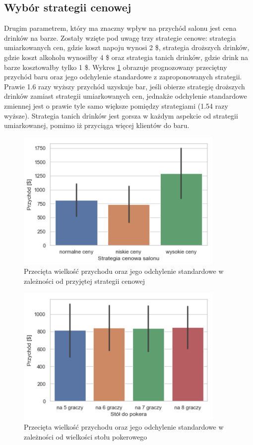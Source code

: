 \documentclass[12pt, a4paper, oneside]{mwart} %
\begin{document}
\subsection{Wybór strategii cenowej}
Drugim parametrem, który ma znaczny wpływ na przychód salonu jest cena drinków na barze. Zostały wzięte pod uwagę trzy strategie cenowe: strategia umiarkowanych cen, gdzie koszt napoju wynosi 2 \$, strategia droższych drinków, gdzie koszt alkoholu wynosiłby 4 \$ oraz strategia tanich drinków, gdzie drink na barze kosztowałby tylko 1 \$. Wykres \ref{wyk_drinki} obrazuje prognozowany przeciętny przychód baru oraz jego odchylenie standardowe z zaproponowanych strategii. Prawie 1.6 razy wyższy przychód uzyskuje bar, jeśli obierze strategię droższych drinków zamiast strategii umiarkowanych cen, jednakże odchylenie standardowe zmiennej jest o prawie tyle samo większe pomiędzy strategiami (1.54 razy wyższe). Strategia tanich drinków jest gorsza w każdym aspekcie od strategii umiarkowanej, pomimo iż przyciąga więcej klientów do baru.

\begin{figure}
\centering
\caption{Przecięta wielkość przychodu oraz jego odchylenie standardowe w zależności od przyjętej strategii cenowej}
\label{wyk_drinki}
\includegraphics[width = 0.9\textwidth]{wykresy/drinki.pdf}
\end{figure}

\begin{figure}
\centering
\caption{Przecięta wielkość przychodu oraz jego odchylenie standardowe w zależności od wielkości stołu pokerowego}
\label{wyk_poker}
\includegraphics[width = 0.9\textwidth]{wykresy/poker.pdf}
\end{figure}
\end{document}
